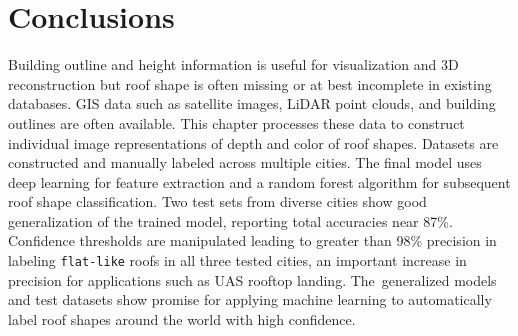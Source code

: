 




\section{Conclusions}

Building outline and height information is useful for  visualization and 3D reconstruction but %
roof shape is often missing or at best incomplete in existing databases.  GIS data such as satellite images, LiDAR point clouds, and building outlines are often available. This chapter processes these data to construct individual image representations of depth and color of roof shapes.   Datasets are constructed and manually labeled across multiple cities. The final model uses deep learning for feature extraction and a random forest algorithm for subsequent roof shape classification.  Two test sets from diverse cities show good generalization of the trained model, reporting total accuracies near 87\%.  Confidence thresholds are manipulated leading to  greater than 98\% precision in labeling \texttt{flat-like} roofs in all three tested cities, an important increase in precision for applications such as UAS rooftop landing.  The~generalized models and test datasets show promise for applying machine learning to automatically label roof shapes around the world with high confidence.